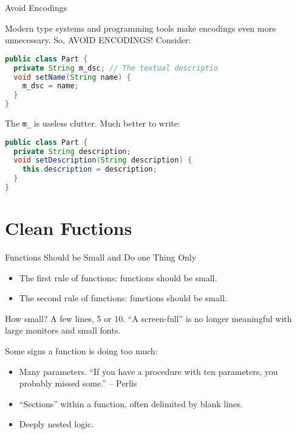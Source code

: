 \documentclass{beamer}
\begin{document}
\begin{frame}[fragile]{Avoid Encodings}


Modern type systems and programming tools make encodings even more unnecessary.  So, AVOID ENCODINGS!  Consider:
\begin{lstlisting}[language=Java]
public class Part {
  private String m_dsc; // The textual descriptio
  void setName(String name) {
    m_dsc = name;
  }
}
\end{lstlisting}
The {\tt m\_} is useless clutter.  Much better to write:
\begin{lstlisting}[language=Java]
public class Part {
  private String description;
  void setDescription(String description) {
    this.description = description;
  }
}
\end{lstlisting}


\end{frame}

\section{Clean Fuctions}

\begin{frame}[fragile]{Functions Should be Small and Do one Thing Only}


\begin{itemize}
\item The first rule of functions: functions should be small.
\item The second rule of functions: functions should be small.
\end{itemize}
How small?  A few lines, 5 or 10.  ``A screen-full'' is no longer meaningful with large monitors and small fonts.

Some signs a function is doing too much:
\begin{itemize}
\item Many parameters.  ``If you have a procedure with ten parameters, you probably missed some.'' -- Perlis
\item ``Sections'' within a function, often delimited by blank lines.
\item Deeply nested logic.
\end{itemize}

\end{frame}
\end{document}
